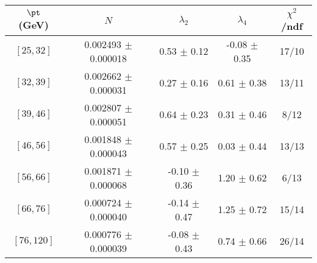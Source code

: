 \begin{tabular}{c||c|c|c|c}
$\pt$ (GeV) & $N$ & $\lambda_{2}$ & $\lambda_4$  & $\chi^2$/ndf  \\
\hline
$[25, 32]$ & 0.002493 $\pm$ 0.000018 & 0.53 $\pm$ 0.12 & -0.08 $\pm$ 0.35 & 17/10\\
$[32, 39]$ & 0.002662 $\pm$ 0.000031 & 0.27 $\pm$ 0.16 & 0.61 $\pm$ 0.38 & 13/11\\
$[39, 46]$ & 0.002807 $\pm$ 0.000051 & 0.64 $\pm$ 0.23 & 0.31 $\pm$ 0.46 & 8/12\\
$[46, 56]$ & 0.001848 $\pm$ 0.000043 & 0.57 $\pm$ 0.25 & 0.03 $\pm$ 0.44 & 13/13\\
$[56, 66]$ & 0.001871 $\pm$ 0.000068 & -0.10 $\pm$ 0.36 & 1.20 $\pm$ 0.62 & 6/13\\
$[66, 76]$ & 0.000724 $\pm$ 0.000040 & -0.14 $\pm$ 0.47 & 1.25 $\pm$ 0.72 & 15/14\\
$[76, 120]$ & 0.000776 $\pm$ 0.000039 & -0.08 $\pm$ 0.43 & 0.74 $\pm$ 0.66 & 26/14\\
\end{tabular}
